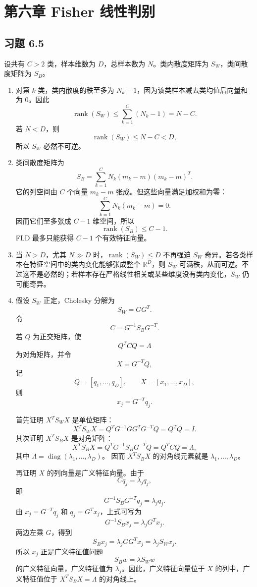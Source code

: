 \documentclass[UTF8,a4paper,12pt]{ctexart}
\begin{document}
\section*{第六章 Fisher 线性判别}

\subsection*{习题 6.5}

设共有 $C>2$ 类，样本维数为 $D$，总样本数为 $N$。类内散度矩阵为 $S_W$，类间散度矩阵为 $S_B$。

\begin{enumerate}
  \item 对第 $k$ 类，类内散度的秩至多为 $N_k-1$，因为该类样本减去类均值后向量和为 $0$。因此
  \[
      \operatorname{rank}(S_W)
      \le \sum_{k=1}^C (N_k-1)
      =N-C.
  \]
  若 $N<D$，则
  \[
      \operatorname{rank}(S_W)\le N-C<D,
  \]
  所以 $S_W$ 必然不可逆。

  \item 类间散度矩阵为
  \[
      S_B=\sum_{k=1}^C N_k(m_k-m)(m_k-m)^T.
  \]
  它的列空间由 $C$ 个向量 $m_k-m$ 张成。但这些向量满足加权和为零：
  \[
      \sum_{k=1}^C N_k(m_k-m)=0.
  \]
  因而它们至多张成 $C-1$ 维空间，所以
  \[
      \operatorname{rank}(S_B)\le C-1.
  \]
  FLD 最多只能获得 $C-1$ 个有效特征向量。

  \item 当 $N>D$，尤其 $N\gg D$ 时，$\operatorname{rank}(S_W)\le D$ 不再强迫 $S_W$ 奇异。若各类样本在特征空间中的类内变化能够张成整个 $\mathbb{R}^D$，则 $S_W$ 可满秩，从而可逆。不过这不是必然的；若样本存在严格线性相关或某些维度没有类内变化，$S_W$ 仍可能奇异。

  \item 假设 $S_W$ 正定，Cholesky 分解为
  \[
      S_W=GG^T.
  \]
  令
  \[
      C=G^{-1}S_BG^{-T}.
  \]
  若 $Q$ 为正交矩阵，使
  \[
      Q^TCQ=\Lambda
  \]
  为对角矩阵，并令
  \[
      X=G^{-T}Q,
  \]
  记
  \[
      Q=[q_1,\ldots,q_D],\qquad
      X=[x_1,\ldots,x_D],
  \]
  则
  \[
      x_j=G^{-T}q_j.
  \]

  首先证明 $X^TS_WX$ 是单位矩阵：
  \[
      X^TS_WX
      =Q^TG^{-1}GG^TG^{-T}Q
      =Q^TQ=I.
  \]
  其次证明 $X^TS_BX$ 是对角矩阵：
  \[
      X^TS_BX
      =Q^TG^{-1}S_BG^{-T}Q
      =Q^TCQ
      =\Lambda,
  \]
  其中 $\Lambda=\operatorname{diag}(\lambda_1,\ldots,\lambda_D)$。
  因而 $X^TS_BX$ 的对角线元素就是 $\lambda_1,\ldots,\lambda_D$。

  再证明 $X$ 的列向量是广义特征向量。由于
  \[
      Cq_j=\lambda_j q_j,
  \]
  即
  \[
      G^{-1}S_BG^{-T}q_j=\lambda_jq_j.
  \]
  由 $x_j=G^{-T}q_j$ 和 $q_j=G^Tx_j$，上式可写为
  \[
      G^{-1}S_Bx_j=\lambda_jG^Tx_j.
  \]
  两边左乘 $G$，得到
  \[
      S_Bx_j=\lambda_jGG^Tx_j=\lambda_jS_Wx_j.
  \]
  所以 $x_j$ 正是广义特征值问题
  \[
      S_Bw=\lambda S_Ww
  \]
  的广义特征向量，广义特征值为 $\lambda_j$。因此，广义特征向量位于 $X$ 的列中，广义特征值位于 $X^TS_BX=\Lambda$ 的对角线上。


\end{enumerate}
\end{document}
